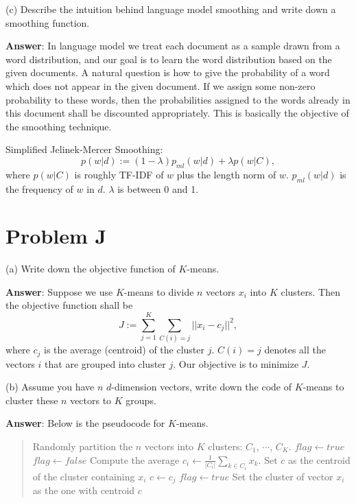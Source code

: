 \documentclass{article}
\begin{document}
(c) Describe the intuition behind language model smoothing and write down a smoothing function.

{\bf Answer}: 
In language model we treat each document as a sample drawn from a word distribution, and our goal is to learn the word distribution based on the given documents. A natural question is how to give the probability of a word which does not appear in the given document. If we assign some non-zero probability to these words, then the probabilities assigned to the words already in this document shall be discounted appropriately. This is basically the objective of the smoothing technique.

Simplified Jelinek-Mercer Smoothing:
$$p(w | d) := (1-\lambda) p_{ml}(w | d) + \lambda p(w | C),$$
where $p(w | C)$ is roughly TF-IDF of $w$ plus the length norm of $w$. $p_{ml}(w | d)$ is the frequency of $w$ in $d$. $\lambda$ is between 0 and 1.

\section{Problem J}
(a) Write down the objective function of $K$-means.

{\bf Answer}:
Suppose we use $K$-means to divide $n$ vectors $x_i$ into $K$ clusters. Then the objective function shall be
$$J := \sum_{j=1} ^K \sum_{C(i) = j} ||x_i - c_j||^2,$$
where $c_j$ is the average (centroid) of the cluster $j$. $C(i) = j$ denotes all the vectors $i$ that are grouped into cluster $j$. Our objective is to minimize $J$.

(b) Assume you have $n$ $d$-dimension vectors, write down the code of $K$-means to cluster these $n$ vectors to $K$ groups.

{\bf Answer}: Below is the pseudocode for $K$-means.
\begin{quote}
\centering
\begin{algorithmic}
\State Randomly partition the $n$ vectors into $K$ clusters: $C_1$, $\cdots$, $C_K$.
\State $flag \gets true$
  \State $flag \gets false$
    \State Compute the average $c_i \gets \frac{1}{|C_i|}\sum_{k\in C_i} x_k$.
  \EndFor
    \State Set $c$ as the centroid of the cluster containing $x_i$
        \State $c \gets c_j$
        \State $flag \gets true$
      \EndIf
    \EndFor
    \State  Set the cluster of vector $x_i$ as the one with centroid $c$
  \EndFor
\EndWhile
\end{algorithmic}
\end{quote}
\end{document}
